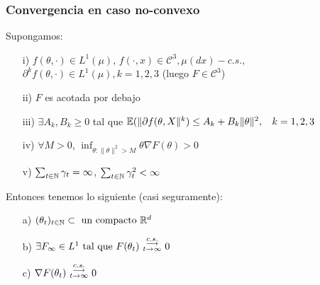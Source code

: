 \subsubsection{Convergencia en caso no-convexo}
\begin{theorem}
\label{theorem:sgd_no_conv}
Supongamos:
\begin{itemize}
    \item[i)] $f(\theta,\cdot)\in L^1(\mu)$, $f(\cdot,x)\in\mathcal{C}^3,  \mu(dx)-c.s.$, $\partial^k f(\theta,\cdot)\in L^1(\mu), k=1,2,3$ (luego $F\in\mathcal{C}^3$)
    \item[ii)] $F$ es acotada por debajo
    \item[iii)] $\exists A_k,B_k\geq 0$ tal que $\mathbb{E}(\|\partial f(\theta,X\|^k)\leq A_k+B_k\|\theta\|^2,\hspace{.25cm}\, k=1,2,3$
    \item[iv)] $\forall M >0$, $\displaystyle \inf_{\theta:\|\theta\|^2>M}\theta\nabla F(\theta)>0$
    \item[v)] $\sum_{t\in\mathbb{N}}\gamma_t=\infty$, $\sum_{t\in\mathbb{N}}\gamma_t^2<\infty$
\end{itemize}
Entonces tenemos lo siguiente (casi seguramente):
\begin{itemize}
    \item[a)] $(\theta_t)_{t\in\mathbb{N}}\subset \mbox{ un compacto }\mathbb{R}^d$
    \item[b)] $\exists F_\infty \in L^1 \mbox{ tal que }F(\theta_t)\mbox{ }\overset{c.s.}{\substack{\longrightarrow \\t \to \infty}}\mbox{ }0$
    \item[c)] $\nabla F(\theta_t)\mbox{ }\overset{c.s.}{\substack{\longrightarrow \\t \to \infty}}\mbox{ } 0$
\end{itemize}
\end{theorem}

